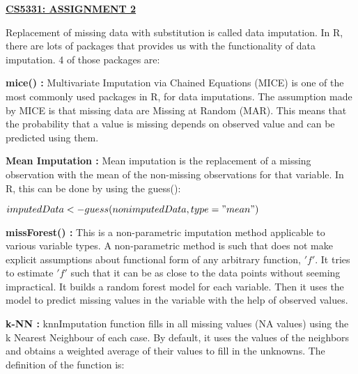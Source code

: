 \documentclass{article}
\begin{document}
\begin{center}
		\underline{\textbf{CS5331: ASSIGNMENT 2}}
\end{center}
	Replacement of missing data with substitution is called data imputation. In R, there are lots of packages that provides us with the functionality of data imputation. 4 of those packages are: \newline\newline
	
	
\textbf{mice() :} Multivariate Imputation via Chained Equations (MICE) is one of the most commonly used packages in R, for data imputations. The assumption made by MICE is that missing data are Missing at Random (MAR). This means that the probability that a value is missing depends on observed value and can be predicted using them. \newline

\textbf{Mean Imputation :} Mean imputation is the replacement of a missing observation with the mean of the non-missing observations for that variable. In R, this can be done by using the guess():\newline

	$imputedData <- guess(nonimputedData,type = "mean")$
	\newline\newline
	
\textbf{missForest() :} This is a non-parametric imputation method applicable to various variable types. A non-parametric method is such that does not make explicit assumptions about functional form of any arbitrary function, $'f'$. It tries to estimate $'f'$ such that it can be as close to the data points without seeming impractical. It builds a random forest model for each variable. Then it uses the model to predict missing values in the variable with the help of observed values. \newline
   
\textbf{k-NN :} knnImputation function fills in all missing values (NA values) using the k Nearest Neighbour of each case. By default, it uses the values of the neighbors and obtains a weighted average of their values to fill in the unknowns. The definition of the function is:\newline
\end{document}
